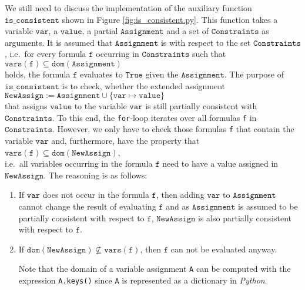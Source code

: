 We still need to discuss the implementation of the auxiliary function $\texttt{is\_consistent}$
shown in Figure \ref{fig:is_consistent.py}.  This function takes a variable $\texttt{var}$, a $\texttt{value}$, a partial 
$\texttt{Assignment}$ and a set of $\texttt{Constraints}$ as arguments.  It is assumed that $\texttt{Assignment}$ is
 with respect to the set $\texttt{Constraints}$, i.e.~for every formula $\texttt{f}$
occurring in $\texttt{Constraints}$ such that
\\[0.2cm]
\hspace*{1.3cm}
$\texttt{vars}(\texttt{f}) \subseteq \texttt{dom}(\texttt{Assignment})$
\\[0.2cm]
holds, the formula $\texttt{f}$ evaluates to $\texttt{True}$ given the $\texttt{Assignment}$.  The purpose of
$\texttt{is\_consistent}$ is to check, whether the extended assignment
\\[0.2cm]
\hspace*{1.3cm}
$\texttt{NewAssign} \;\texttt{:=}\;\texttt{Assignment} \cup \{ \texttt{var} \mapsto \texttt{value} \}$
\\[0.2cm]
that assigns $\texttt{value}$ to the variable $\texttt{var}$ is still partially consistent with $\texttt{Constraints}$. 
To this end, the \texttt{for}-loop iterates over all formulas \texttt{f} in $\texttt{Constraints}$. 
However, we only have to check those formulas \texttt{f} that contain the variable $\texttt{var}$ and,
furthermore, have the property that
\\[0.2cm]
\hspace*{1.3cm}
$\texttt{vars}(\texttt{f}) \subseteq \texttt{dom}(\texttt{NewAssign})$,
\\[0.2cm]
i.e.~all variables occurring in the formula $\texttt{f}$ need to have a value assigned in
$\texttt{NewAssign}$.  The reasoning is as follows:
\begin{enumerate}
\item If $\texttt{var}$ does not occur in the formula $\texttt{f}$, then adding $\texttt{var}$ to
      $\texttt{Assignment}$ cannot change the result of evaluating $\texttt{f}$ and as
      $\texttt{Assignment}$ is assumed to be partially consistent with respect to $\texttt{f}$, 
      $\texttt{NewAssign}$ is also partially consistent with respect to $\texttt{f}$.
\item If $\texttt{dom}(\texttt{NewAssign}) \not\subseteq \texttt{vars}(\texttt{f})$, then $\texttt{f}$ can not
      be evaluated anyway. 

      Note that the domain of a variable assignment \texttt{A} can be computed with the expression 
      \texttt{A.keys()} since \texttt{A} is represented as a dictionary in \textsl{Python}.
\end{enumerate}

